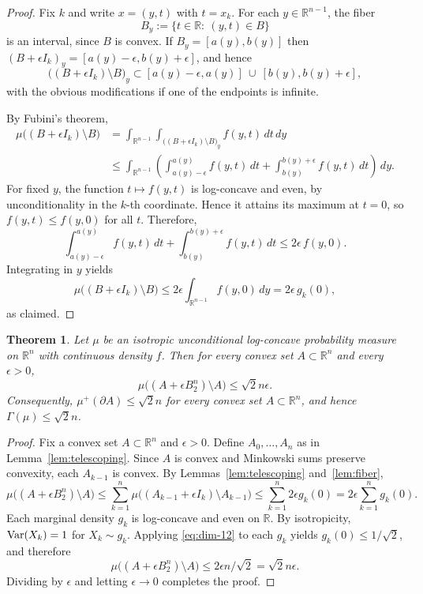 \documentclass[11pt,leqno]{article}
\newtheorem{theorem}{Theorem}[section]
\theoremstyle{remark}
\numberwithin{equation}{section}
\newcommand{\ls}{\leqslant}
\begin{document}
\begin{proof}Fix $k$ and write $x=(y,t)$ with $t=x_k$. For each $y\in\mathbb{R}^{n-1}$, the fiber
$$B_y:=\{t\in\mathbb{R}:\ (y,t)\in B\}$$
is an interval, since $B$ is convex. If $B_y=[a(y),b(y)]$ then $(B+\epsilon I_k)_y=[a(y)-\epsilon,b(y)+\epsilon]$, and hence
$$\big((B+\epsilon I_k)\setminus B\big)_y \subset [a(y)-\epsilon,a(y)]\ \cup\ [b(y),b(y)+\epsilon],$$
with the obvious modifications if one of the endpoints is infinite.
	
By Fubini's theorem,
\begin{align*}
\mu\big((B+\epsilon I_k)\setminus B\big)&=\int_{\mathbb{R}^{n-1}} \int_{\big((B+\epsilon I_k)\setminus B\big)_y} f(y,t)\,dt\,dy \\
&\ls \int_{\mathbb{R}^{n-1}}\left(\int_{a(y)-\epsilon}^{a(y)} f(y,t)\,dt+\int_{b(y)}^{b(y)+\epsilon} f(y,t)\,dt\right)\,dy.
\end{align*}
For fixed $y$, the function $t\mapsto f(y,t)$ is log-concave and even, 
by unconditionality in the $k$-th coordinate. Hence it attains its maximum at $t=0$, so $f(y,t)\ls f(y,0)$ for all $t$.
Therefore,
$$\int_{a(y)-\epsilon}^{a(y)} f(y,t)\,dt+\int_{b(y)}^{b(y)+\epsilon} f(y,t)\,dt \ls 2\epsilon\, f(y,0).$$
Integrating in $y$ yields
$$\mu\big((B+\epsilon I_k)\setminus B\big)\ls 2\epsilon \int_{\mathbb{R}^{n-1}} f(y,0)\,dy = 2\epsilon\, g_k(0),$$
as claimed.
\end{proof}


\begin{theorem}\label{th:unconditional}
Let $\mu$ be an isotropic unconditional log-concave probability measure on $\mathbb{R}^n$
with continuous density $f$. Then for every convex set $A\subset\mathbb{R}^n$ and every $\epsilon>0$,
$$\mu\big((A+\epsilon B_2^n)\setminus A\big)\ls\sqrt{2}n\epsilon.$$
Consequently, $\mu^+(\partial A)\ls\sqrt{2}n$ for every convex set $A\subset\mathbb{R}^n$, 
and hence $\Gamma(\mu)\ls \sqrt{2}n$.
\end{theorem}

\begin{proof}Fix a convex set $A\subset\mathbb{R}^n$ and $\epsilon>0$. Define $A_0,\dots,A_n$ as in Lemma~\ref{lem:telescoping}.
Since $A$ is convex and Minkowski sums preserve convexity, each $A_{k-1}$ is convex.
By Lemmas~\ref{lem:telescoping} and~\ref{lem:fiber},
$$\mu\big((A+\epsilon B_2^n)\setminus A\big)\ls \sum_{k=1}^n \mu\big((A_{k-1}+\epsilon I_k)\setminus A_{k-1}\big)\ls \sum_{k=1}^n 2\epsilon g_k(0)
=2\epsilon\sum_{k=1}^n g_k(0).$$
Each marginal density $g_k$ is log-concave and even on $\mathbb{R}$. 
By isotropicity, ${\rm Var}(X_k)=1$ for $X_k\sim g_k$. Applying \eqref{eq:dim-12} to each $g_k$ yields $g_k(0)\ls 1/\sqrt{2}$, and therefore
$$\mu\big((A+\epsilon B_2^n)\setminus A\big)\ls 2\epsilon n/\sqrt{2}=\sqrt{2}n\epsilon.$$
Dividing by $\epsilon$ and letting $\epsilon\to 0$ completes the proof.
\end{proof}
\end{document}
